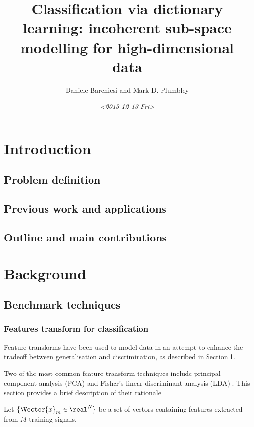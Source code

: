 \documentclass[]{article}
\author{Daniele Barchiesi and Mark D. Plumbley}
\date{\textit{<2013-12-13 Fri>}}
\title{Classification via dictionary learning: incoherent sub-space modelling for high-dimensional data}
\begin{document}
\maketitle


\begin{abstract}

\end{abstract}

\section{Introduction}
\label{sec-1}
\subsection{Problem definition}
\label{sec-1-1}
\subsection{Previous work and applications}
\label{sec-1-2}

\subsection{Outline and main contributions}
\label{sec-1-3}

\section{Background}
\label{sec-2}
\subsection{Benchmark techniques}
\label{sec-2-1}
\subsubsection{Features transform for classification}
\label{sec-2-1-1}
Feature transforms have been used to model data in an attempt to enhance the tradeoff between generalisation and discrimination, as described in Section \ref{sec-1}.

Two of the most common feature transform techniques include principal component analysis (PCA) \cite{Pearson1901On} and Fisher's linear discriminant analysis (LDA) \cite{Duda1973Pa}. This section provides a brief description of their rationale.

Let $\{\Vector{x}_m \in \real^N\}$ be a set of vectors containing features extracted from $M$ training signals.
\end{document}

